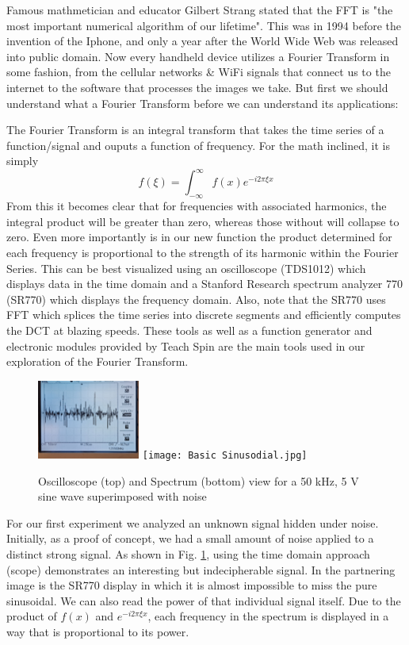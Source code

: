 \documentclass[prl,twocolumn,superscriptaddress,floatfix]{revtex4}
\begin{document}
Famous mathmetician and educator Gilbert Strang stated that the FFT is "the most important numerical algorithm of our lifetime"\cite{strang}.
This was in 1994 before the invention of the Iphone, and only a year after the World Wide Web was released into public domain\cite{cernweb}.
Now every handheld device utilizes a Fourier Transform in some fashion, from the cellular networks \& WiFi signals that connect us to the internet to the software that processes the images we take. But first we should understand what a Fourier Transform before we can understand its applications:

The Fourier Transform is an integral transform that takes the time series of a function/signal and ouputs a function of frequency. For the math inclined, it is simply
\begin{equation}
f(\xi) = \int_{-\infty}^{\infty} f(x)e^{-i2\pi \xi x}  \label{firstequation}
\end{equation}
From this it becomes clear that for frequencies with associated harmonics, the integral product will be greater than zero, whereas those without will collapse to zero.
Even more importantly is in our new function the product determined for each frequency is proportional to the strength of its harmonic within the Fourier Series.
This can be best visualized using an oscilloscope (TDS1012) which displays data in the time domain and a Stanford Research spectrum analyzer 770 (SR770) which displays the frequency domain.
Also, note that the SR770 uses FFT which splices the time series into discrete segments and efficiently computes the DCT at blazing speeds. These tools as well as a function generator and electronic modules provided
by Teach Spin are the main tools used in our exploration of the Fourier Transform.

\begin{figure}[H]
    \begin{center}
    \includegraphics[width = 0.3\textwidth]{Time Data.jpg}
    \texttt{[image: Basic Sinusodial.jpg]}
    \caption{\label{fig:1}Oscilloscope (top) and Spectrum (bottom) view for a 50 kHz, 5 V sine wave superimposed with noise}
    \end{center}
\end{figure}
For our first experiment we analyzed an unknown signal hidden under noise. Initially, as a proof of concept, we had a small amount of noise applied to a distinct strong signal.
As shown in Fig. \ref{fig:1}, using the time domain approach (scope) demonstrates an interesting but indecipherable signal.
In the partnering image is the SR770 display in which it is almost impossible to miss the pure sinusoidal. 
We can also read the power of that individual signal itself. Due to the product of $f(x)$ and $e^{-i2 \pi \xi x}$, each frequency in the spectrum is displayed in a way that is proportional to its power.
\end{document}
